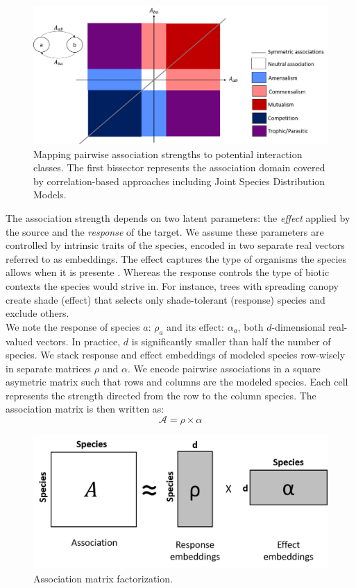 \documentclass[]{article}
\begin{document}
\begin{figure}[h]
	\centering
	\includegraphics[scale=0.4]{assoc_classif}
	\caption{Mapping pairwise association strengths to potential interaction classes. The first bissector represents the association domain covered by correlation-based approaches including Joint Species Distribution Models. }
	\label{assocdomain}
\end{figure}

\noindent The association strength depends on two latent parameters: the \textit{effect} applied by the source and the \textit{response} of the target. We assume these parameters are controlled by intrinsic traits of the species, encoded in two separate real vectors referred to as embeddings. The effect captures the type of organisms the species allows when it is presente . Whereas the response controls the type of biotic contexts the species would strive in. For instance, trees with spreading canopy create shade (effect) that selects only shade-tolerant (response) species and exclude others.   \\ 

\noindent We note the response of species $a$: $\rho_a$ and its effect: $\alpha_a$, both $d$-dimensional real-valued vectors. In practice, $d$ is significantly smaller than half the number of species. We stack response and effect embeddings of modeled species row-wisely in separate matrices $\rho$ and $\alpha$. We encode pairwise associations in a square asymetric matrix such that rows and columns are the modeled species. Each cell represents the strength directed from the row to the column species.  The association matrix is then written as: 
\begin{equation*}
	\mathcal{A} = \rho \times \alpha
\end{equation*}

\begin{figure}[h]
	\centering
	\includegraphics[scale=0.5]{factorization}
	\caption{Association matrix factorization.}
	\label{factoriz}
\end{figure}
\end{document}
